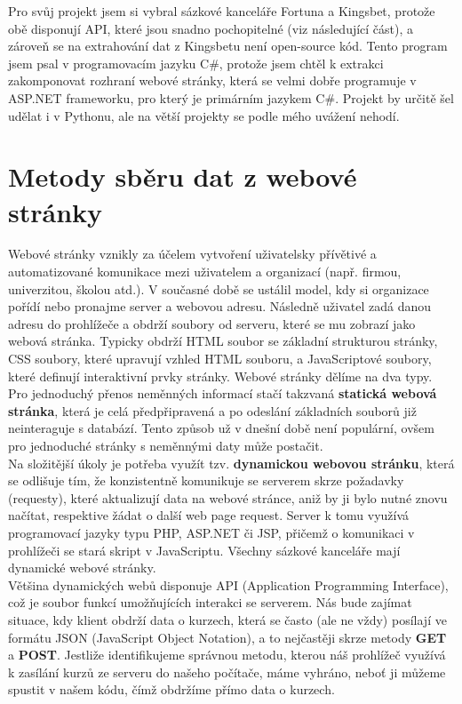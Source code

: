 \documentclass[11pt,a4paper,twoside,openright]{report}
\begin{document}
Pro svůj projekt jsem si vybral sázkové kanceláře Fortuna a Kingsbet, protože obě disponují API, které jsou snadno pochopitelné (viz následující část), a zároveň se na extrahování dat z Kingsbetu není open-source kód. Tento program jsem psal v programovacím jazyku C\#, protože jsem chtěl k extrakci zakomponovat rozhraní webové stránky, která se velmi dobře programuje v ASP.NET frameworku, pro který je primárním jazykem C\#. Projekt by určitě šel udělat i v Pythonu, ale na větší projekty se podle mého uvážení nehodí. 

\section{Metody sběru dat z webové stránky}
Webové stránky vznikly za účelem vytvoření uživatelsky přívětivé a automatizované komunikace mezi uživatelem a organizací (např. firmou, univerzitou, školou atd.). V současné době se ustálil model, kdy si organizace pořídí nebo pronajme server a webovou adresu. Následně uživatel zadá danou adresu do prohlížeče a obdrží soubory od serveru, které se mu zobrazí jako webová stránka. Typicky obdrží HTML soubor se základní strukturou stránky, CSS soubory, které upravují vzhled HTML souboru, a JavaScriptové soubory, které definují interaktivní prvky stránky. Webové stránky dělíme na dva typy. \cite{gfg_webpage}\\

Pro jednoduchý přenos neměnných informací stačí takzvaná \textbf{statická webová stránka}, která je celá předpřipravená a po odeslání základních souborů již neinteraguje s databází. Tento způsob už v dnešní době není populární, ovšem pro jednoduché stránky s neměnnými daty může postačit. \\

Na složitější úkoly je potřeba využít tzv. \textbf{dynamickou webovou stránku}, která se odlišuje tím, že konzistentně komunikuje se serverem skrze požadavky (requesty), které aktualizují data na webové stránce, aniž by ji bylo nutné znovu načítat, respektive žádat o další web page request. Server k tomu využívá programovací jazyky typu PHP, ASP.NET či JSP, přičemž o komunikaci v prohlížeči se stará skript v JavaScriptu. \cite{gfg_dynamic} Všechny sázkové kanceláře mají dynamické webové stránky. \\

Většina dynamických webů disponuje API (Application Programming Interface), což je soubor funkcí umožňujících interakci se serverem. \cite{gfg_webapi} Nás bude zajímat situace, kdy klient obdrží data o kurzech, která se často (ale ne vždy) posílají ve formátu JSON (JavaScript Object Notation), a to nejčastěji skrze metody \textbf{GET} a \textbf{POST}. Jestliže identifikujeme správnou metodu, kterou náš prohlížeč využívá k zasílání kurzů ze serveru do našeho počítače, máme vyhráno, neboť ji můžeme spustit v našem kódu, čímž obdržíme přímo data o kurzech.
\end{document}
